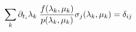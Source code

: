 \begin{equation}
\sum_k \partial_{t_i} \lambda_k \;{f(\lambda_k,\mu_k) \over  p(\lambda_k,\mu_k)} \sigma_j(\lambda_k,\mu_k) = \delta_{ij}
\label{disturbing}
\end{equation}

